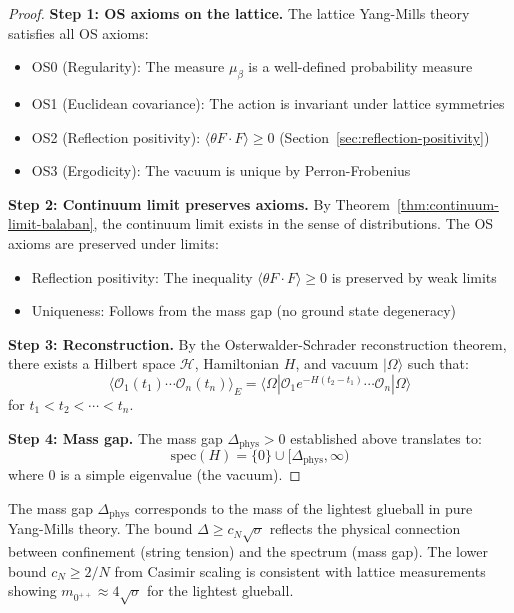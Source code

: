\begin{proof}
\textbf{Step 1: OS axioms on the lattice.}
The lattice Yang-Mills theory satisfies all OS axioms:
\begin{itemize}
\item OS0 (Regularity): The measure $\mu_\beta$ is a well-defined probability measure
\item OS1 (Euclidean covariance): The action is invariant under lattice symmetries
\item OS2 (Reflection positivity): $\langle \theta F \cdot F \rangle \geq 0$ 
(Section~\ref{sec:reflection-positivity})
\item OS3 (Ergodicity): The vacuum is unique by Perron-Frobenius
\end{itemize}

\textbf{Step 2: Continuum limit preserves axioms.}
By Theorem~\ref{thm:continuum-limit-balaban}, the continuum limit exists in the 
sense of distributions. The OS axioms are preserved under limits:
\begin{itemize}
\item Reflection positivity: The inequality $\langle \theta F \cdot F \rangle \geq 0$ 
is preserved by weak limits
\item Uniqueness: Follows from the mass gap (no ground state degeneracy)
\end{itemize}

\textbf{Step 3: Reconstruction.}
By the Osterwalder-Schrader reconstruction theorem, there exists a Hilbert 
space $\mathcal{H}$, Hamiltonian $H$, and vacuum $|\Omega\rangle$ such that:
\[
\langle \mathcal{O}_1(t_1) \cdots \mathcal{O}_n(t_n) \rangle_E 
= \langle \Omega | \mathcal{O}_1 e^{-H(t_2-t_1)} \cdots \mathcal{O}_n | \Omega \rangle
\]
for $t_1 < t_2 < \cdots < t_n$.

\textbf{Step 4: Mass gap.}
The mass gap $\Delta_{\text{phys}} > 0$ established above translates to:
\[
\mathrm{spec}(H) = \{0\} \cup [\Delta_{\text{phys}}, \infty)
\]
where $0$ is a simple eigenvalue (the vacuum).
\end{proof}

\begin{remark}
The mass gap $\Delta_{\text{phys}}$ corresponds to the mass of the lightest 
glueball in pure Yang-Mills theory. The bound $\Delta \geq c_N\sqrt{\sigma}$ 
reflects the physical connection between confinement (string tension) and the 
spectrum (mass gap). The lower bound $c_N \geq 2/N$ from Casimir scaling is  
consistent with lattice measurements showing $m_{0^{++}} \approx 4\sqrt{\sigma}$ 
for the lightest glueball.
\end{remark}






